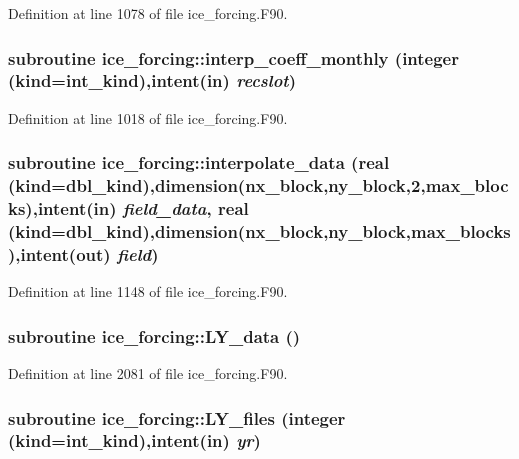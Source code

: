 Definition at line 1078 of file ice\_\-forcing.F90.\hypertarget{namespaceice__forcing_a9da649682a06b9b9fb085742a770d940}{
\subsubsection[{interp\_\-coeff\_\-monthly}]{\setlength{\rightskip}{0pt plus 5cm}subroutine ice\_\-forcing::interp\_\-coeff\_\-monthly (integer (kind=int\_\-kind),intent(in) {\em recslot})}}
\label{namespaceice__forcing_a9da649682a06b9b9fb085742a770d940}


Definition at line 1018 of file ice\_\-forcing.F90.\hypertarget{namespaceice__forcing_aaa8b12715d3c39535f631da2fcc76c21}{
\subsubsection[{interpolate\_\-data}]{\setlength{\rightskip}{0pt plus 5cm}subroutine ice\_\-forcing::interpolate\_\-data (real (kind=dbl\_\-kind),dimension(nx\_\-block,ny\_\-block,2,max\_\-blocks),intent(in) {\em field\_\-data}, \/  real (kind=dbl\_\-kind),dimension(nx\_\-block,ny\_\-block,max\_\-blocks),intent(out) {\em field})}}
\label{namespaceice__forcing_aaa8b12715d3c39535f631da2fcc76c21}


Definition at line 1148 of file ice\_\-forcing.F90.\hypertarget{namespaceice__forcing_af090b8a3141de745a9f1893256289b0b}{
\subsubsection[{LY\_\-data}]{\setlength{\rightskip}{0pt plus 5cm}subroutine ice\_\-forcing::LY\_\-data ()}}
\label{namespaceice__forcing_af090b8a3141de745a9f1893256289b0b}


Definition at line 2081 of file ice\_\-forcing.F90.\hypertarget{namespaceice__forcing_a4efb2f31dda4004f4fefadeac72d74a5}{
\subsubsection[{LY\_\-files}]{\setlength{\rightskip}{0pt plus 5cm}subroutine ice\_\-forcing::LY\_\-files (integer (kind=int\_\-kind),intent(in) {\em yr})}}
\label{namespaceice__forcing_a4efb2f31dda4004f4fefadeac72d74a5}


